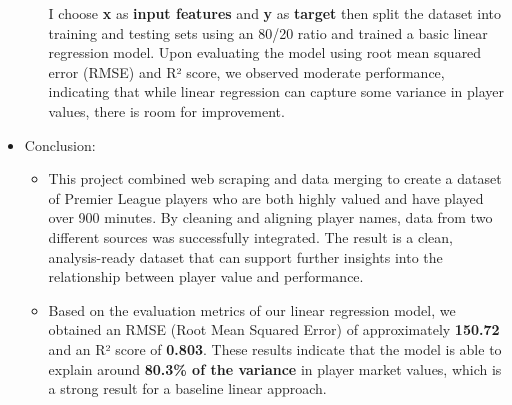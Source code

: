 \documentclass[a4paper,12pt]{article}
\begin{document}
\begin{itemize}[label= {*}, leftmargin= 1cm]
\begin{itemize}[label= {}, leftmargin= 1cm]
        I choose \textbf{x} as \textbf{input features} and \textbf{y} as \textbf{target} then split the dataset into training and testing sets using an 80/20 ratio and trained a basic linear regression model. Upon evaluating the model using root mean squared error (RMSE) and R² score, we observed moderate performance, indicating that while linear regression can capture some variance in player values, there is room for improvement.
        
    \end{itemize}
    \item {\Large Conclusion:}
    \begin{itemize}[label= {-}, leftmargin= 1cm]
        \item This project combined web scraping and data merging to create a dataset of Premier League players who are both highly valued and have played over 900 minutes. By cleaning and aligning player names, data from two different sources was successfully integrated. The result is a clean, analysis-ready dataset that can support further insights into the relationship between player value and performance.
        \newpage
        \item Based on the evaluation metrics of our linear regression model, we obtained an RMSE (Root Mean Squared Error) of approximately \textbf{150.72} and an R² score of \textbf{0.803}. These results indicate that the model is able to explain around \textbf{80.3\% of the variance} in player market values, which is a strong result for a baseline linear approach.
    \end{itemize}
\end{itemize}
\end{document}
